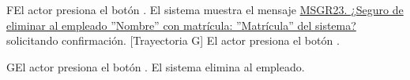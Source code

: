 \begin{UCtrayectoriaA}{F}{El actor presiona el botón .}
    \UCpaso El sistema muestra el mensaje \hyperref[MSGR23]{MSGR23. ¿Seguro de eliminar al empleado ''Nombre'' con matrícula: ''Matrícula'' del sistema?} solicitando confirmación. [Trayectoria G]
    \UCpaso[\UCactor] El actor presiona el botón .
\end{UCtrayectoriaA}

\begin{UCtrayectoriaA}{G}{El actor presiona el botón .}
    \UCpaso     El sistema elimina al empleado.  
\end{UCtrayectoriaA}

